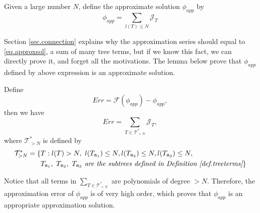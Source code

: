 \begin{defn}
Given a large number $N$, define the approximate solution $\phi_{app}$ by
\begin{equation}\label{eq.approxsol}
    \phi_{app}=\sum_{l(T)\le N} \mathcal{J}_T
\end{equation}
\end{defn}

Section \ref{sec.connection} explains why the approximation series should equal to \eqref{eq.approxsol}, a sum of many tree terms, but if we know this fact, we can directly prove it, and forget all the motivations. The lemma below prove that $\phi_{app}$ defined by above expression is an approximate solution.  

\begin{lem}\label{lem.approxerror} Define 
\begin{equation}
    Err=\mathcal{F}(\phi_{app})-\phi_{app},
\end{equation}
then we have 
\begin{equation}\label{eq.approxerror}
    Err=\sum_{T\in \mathcal{T}_{>N}^*} \mathcal{J}_T,
\end{equation}
where $\mathcal{T}_{>N}^*$ is defined by
\begin{equation}
\begin{split}
    \mathcal{T}_{>N}^*=\{&T:l(T)>N,\ l(T_{\mathfrak{n}_1})\le N,
    l(T_{\mathfrak{n}_2})\le N,
    l(T_{\mathfrak{n}_3})\le N,
    \\
    &T_{\mathfrak{n}_1},\ T_{\mathfrak{n}_2},\ T_{\mathfrak{n}_3}\textit{ are the subtrees defined in Definition \ref{def.treeterms}} \}
\end{split}
\end{equation}
\end{lem}

\begin{rem}
Notice that all terms in $\sum_{T\in \mathcal{T}_{>N}^*}$ are polynomials of degree $>N$. Therefore, the approximation error of $\phi_{app}$ is of very high order, which proves that $\phi_{app}$ is an appropriate approximation solution. 
\end{rem}


